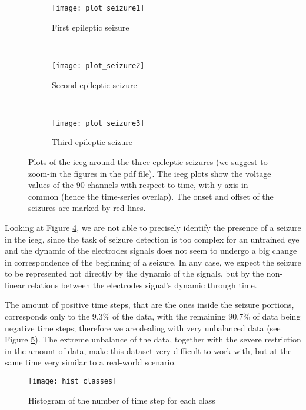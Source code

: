 \begin{figure}[H]
    \centering
    \begin{subfigure}[t]{0.7\textwidth}
		\texttt{[image: plot\_seizure1]}
        \caption{First epileptic seizure}
        \label{fig:plot_seizure1}
	\end{subfigure}
	~
	\begin{subfigure}[t]{0.7\textwidth}
		\texttt{[image: plot\_seizure2]}
        \caption{Second epileptic seizure}
        \label{fig:plot_seizure2}
    \end{subfigure}
    ~
    \begin{subfigure}[t]{0.7\textwidth}
		\texttt{[image: plot\_seizure3]}
        \caption{Third epileptic seizure}
        \label{fig:plot_seizure3}
	\end{subfigure}
    \caption{Plots of the \acs{ieeg} around the three epileptic seizures (we suggest to zoom-in the figures in the pdf file). The \acs{ieeg} plots show the voltage values of the 90 channels with respect to time, with y axis in common (hence the time-series overlap). The onset and offset of the seizures are marked by red lines.}
    \label{fig:plot_seizures}
\end{figure}
\newpage

Looking at Figure \ref{fig:plot_seizures}, we are not able to precisely identify the presence of a seizure in the \acs{ieeg}, since the task of seizure detection is too complex for an untrained eye and the dynamic of the electrodes signals does not seem to undergo a big change in correspondence of the beginning of a seizure. In any case, we expect the seizure to be represented not directly by the dynamic of the signals, but by the non-linear relations between the electrodes signal's dynamic through time.

The amount of positive time steps, that are the ones inside the seizure portions, corresponds only to the $9.3$\% of the data, with the remaining $90.7$\% of data being negative time steps; therefore we are dealing with very unbalanced data (see Figure \ref{fig:hist_classes}). The extreme unbalance of the data, together with the severe restriction in the amount of data, make this dataset very difficult to work with, but at the same time very similar to a real-world scenario.
\begin{figure}[htbp]
    \centering
    \texttt{[image: hist\_classes]}
    \caption{Histogram of the number of time step for each class}
    \label{fig:hist_classes}
\end{figure}

